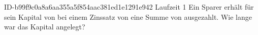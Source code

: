 \begin{exercise}
      {ID-b99f9c0a8a6aa355a5f854aac381ed1e1291e942}
      {Laufzeit 1}
  \ifproblem\problem
    Ein Sparer erhält für sein Kapital von  bei einem Zinssatz
    von  eine Summe von  ausgezahlt. Wie lange war das
    Kapital angelegt?
  \fi
\end{exercise}
